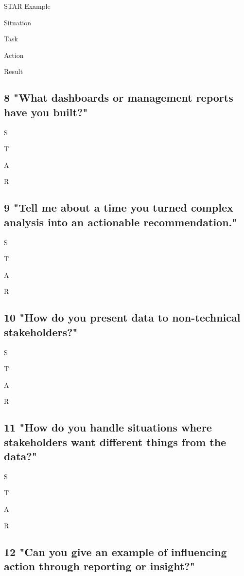 \documentclass[
  letterpaper,
]{scrbook}
\begin{document}
STAR Example

Situation

Task

Action

Result

\subsection{8 "What dashboards or management reports have you
built?"}\label{what-dashboards-or-management-reports-have-you-built}

S

T

A

R

\subsection{9 "Tell me about a time you turned complex analysis into an
actionable
recommendation."}\label{tell-me-about-a-time-you-turned-complex-analysis-into-an-actionable-recommendation.}

S

T

A

R

\subsection{10 "How do you present data to non-technical
stakeholders?"}\label{how-do-you-present-data-to-non-technical-stakeholders}

S

T

A

R

\subsection{11 "How do you handle situations where stakeholders want
different things from the
data?"}\label{how-do-you-handle-situations-where-stakeholders-want-different-things-from-the-data}

S

T

A

R

\subsection{12 "Can you give an example of influencing action through
reporting or
insight?"}\label{can-you-give-an-example-of-influencing-action-through-reporting-or-insight}
\end{document}
